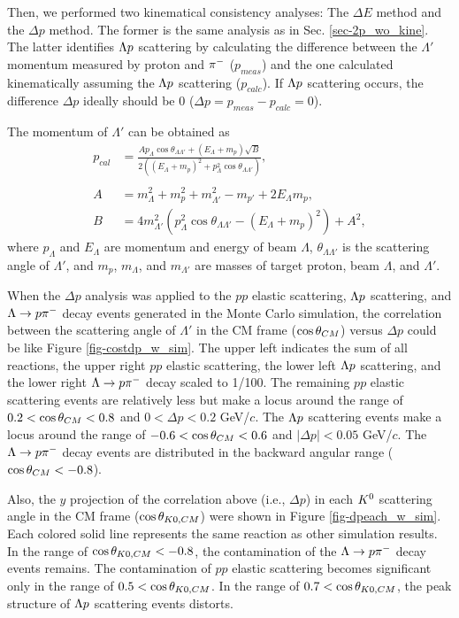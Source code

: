 Then, we performed two kinematical consistency analyses: The $\Delta E$ method and the $\Delta p$ method. The former is the same analysis as in Sec. \ref{sec-2p_wo_kine}. The latter identifies $\Lambda p$ scattering by calculating the difference between the $\Lambda'$ momentum measured by proton and $\pi^{-}$ ($p_{meas}$) and the one calculated kinematically assuming the $\Lambda p$ scattering ($p_{calc}$). If $\Lambda p$ scattering occurs, the difference $\Delta p$ ideally should be 0 ($\Delta p = p_{meas} - p_{calc} = 0$).

The momentum of $\Lambda'$ can be obtained as
\begin{align}
  p_{cal} &= \frac{A p_{\Lambda} \cos{\theta_{\Lambda\Lambda'}} + (E_{\Lambda} + m_{p}) \sqrt{B}} {2 ((E_{\Lambda} + m_{p})^{2} + p_{\Lambda}^{2} \cos{\theta_{\Lambda\Lambda'}})}, \\
  \nonumber \\
  A &= m_{\Lambda}^{2} + m_{p}^{2} + m_{\Lambda'}^{2} - m_{p'} + 2 E_{\Lambda} m_{p}, \\
  B &= 4 m_{\Lambda'}^{2} (p_{\Lambda}^{2} \cos{\theta_{\Lambda\Lambda'}} - (E_{\Lambda} + m_{p})^{2}) + A^{2},
  \label{eq-dp_scatL}
\end{align}
where $p_{\Lambda}$ and $E_{\Lambda}$ are momentum and energy of beam $\Lambda$, $\theta_{\Lambda\Lambda'}$ is the scattering angle of $\Lambda'$, and $m_{p}$, $m_{\Lambda}$, and $m_{\Lambda'}$ are masses of target proton, beam $\Lambda$, and $\Lambda'$.

When the $\Delta p$ analysis was applied to the $pp$ elastic scattering, $\Lambda p$ scattering, and $\Lambda\to p\pi^{-}$ decay events generated in the Monte Carlo simulation, the correlation between the scattering angle of $\Lambda'$ in the CM frame ($\cos{\theta}_{CM}$) versus $\Delta p$ could be like Figure \ref{fig-costdp_w_sim}. 
The upper left indicates the sum of all reactions, the upper right $pp$ elastic scattering, the lower left $\Lambda p$ scattering, and the lower right $\Lambda\to p\pi^{-}$ decay scaled to 1/100.
The remaining $pp$ elastic scattering events are relatively less but make a locus around the range of $0.2<\cos{\theta}_{CM}<0.8$ and $0<\Delta p<0.2$ GeV/$c$. The $\Lambda p$ scattering events make a locus around the range of $-0.6<\cos{\theta}_{CM}<0.6$ and $|\Delta p|<0.05$ GeV/$c$. The $\Lambda\to p\pi^{-}$ decay events are distributed in the backward angular range ($\cos{\theta}_{CM}<-0.8$).

Also, the $y$ projection of the correlation above (i.e., $\Delta p$) in each $K^{0}$ scattering angle in the CM frame ($\cos{\theta_{K0,CM}}$) were shown in Figure \ref{fig-dpeach_w_sim}. 
Each colored solid line represents the same reaction as other simulation results.
In the range of $\cos{\theta_{K0,CM}}<-0.8$, the contamination of the $\Lambda\to p\pi^{-}$ decay events remains. The contamination of $pp$ elastic scattering becomes significant only in the range of $0.5<\cos{\theta_{K0,CM}}$. In the range of $0.7<\cos{\theta_{K0,CM}}$, the peak structure of $\Lambda p$ scattering events distorts.

